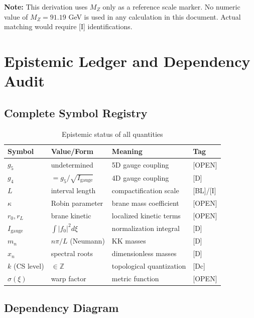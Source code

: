 \documentclass[11pt,a4paper]{article}
\begin{document}
\begin{openitembox}
\textbf{Note:} This derivation uses $M_Z$ only as a reference scale marker. No numeric
value of $M_Z = 91.19$ GeV is used in any calculation in this document. Actual
matching would require [I] identifications.
\end{openitembox}

\section{Epistemic Ledger and Dependency Audit}
\label{sec:ledger}

\subsection{Complete Symbol Registry}

\begin{table}[h]
\centering
\caption{Epistemic status of all quantities}
\label{tab:ledger}
\begin{tabular}{llp{5cm}l}
\toprule
Symbol & Value/Form & Meaning & Tag \\
\midrule
$g_5$ & undetermined & 5D gauge coupling & [OPEN] \\
$g_4$ & $= g_5/\sqrt{I_{\text{gauge}}}$ & 4D gauge coupling & [D] \\
$L$ & interval length & compactification scale & [BL]/[I] \\
$\kappa$ & Robin parameter & brane mass coefficient & [OPEN] \\
$r_0, r_L$ & brane kinetic & localized kinetic terms & [OPEN] \\
$I_{\text{gauge}}$ & $\int |f_0|^2 d\xi$ & normalization integral & [D] \\
$m_n$ & $n\pi/L$ (Neumann) & KK masses & [D] \\
$x_n$ & spectral roots & dimensionless masses & [D] \\
$k$ (CS level) & $\in \mathbb{Z}$ & topological quantization & [Dc] \\
$\sigma(\xi)$ & warp factor & metric function & [OPEN] \\
\bottomrule
\end{tabular}
\end{table}

\subsection{Dependency Diagram}
\end{document}
